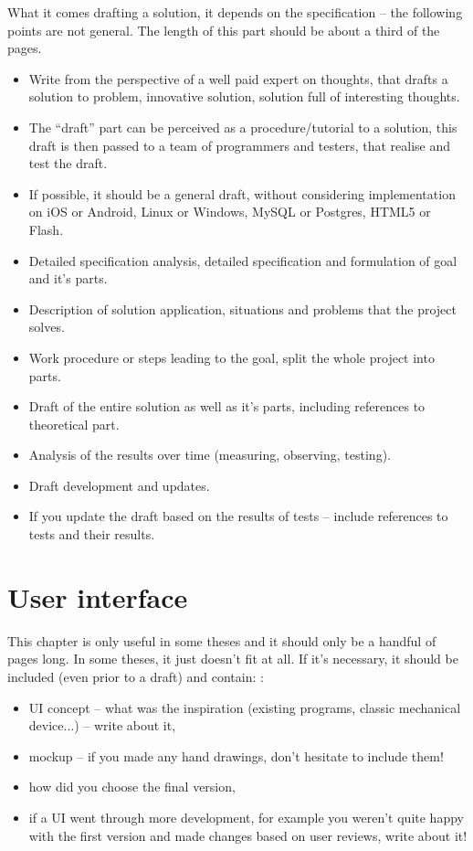 What it comes drafting a solution, it depends on the specification -- the following points are not general. The length of this part should be about a third of the pages.
\begin{itemize}
  \item{Write from the perspective of a well paid expert on thoughts, that drafts a solution to problem, innovative solution, solution full of interesting thoughts.}
  \item{The ``draft'' part can be perceived as a procedure/tutorial to a solution, this draft is then passed to a team of programmers and testers, that realise and test the draft.}
  \item{If possible, it should be a general draft, without considering implementation on iOS or Android, Linux or Windows, MySQL or Postgres, HTML5 or Flash.}
  \item{Detailed specification analysis, detailed specification and formulation of goal and it's parts.}
  \item{Description of solution application, situations and problems that the project solves.}
  \item{Work procedure or steps leading to the goal, split the whole project into parts.}
  \item{Draft of the entire solution as well as it's parts, including references to theoretical part.}
  \item{Analysis of the results over time (measuring, observing, testing).}
  \item{Draft development and updates.}
  \item{If you update the draft based on the results of tests -- include references to tests and their results.}
\end{itemize}

\section{User interface}

This chapter is only useful in some theses and it should only be a handful of pages long. In some theses, it just doesn't fit at all. If it's necessary, it should be included (even prior to a draft) and contain: \cite{Cernocky}:
\begin{itemize}
  \item{UI concept -- what was the inspiration (existing programs, classic mechanical device...) -- write about it,}
  \item{mockup -- if you made any hand drawings, don't hesitate to include them!}
  \item{how did you choose the final version,}
  \item{if a UI went through more development, for example you weren't quite happy with the first version and made changes based on user reviews, write about it!}
\end{itemize}


